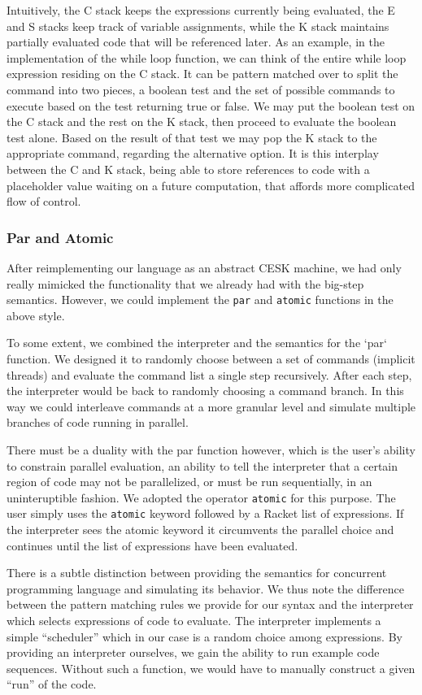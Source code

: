 Intuitively, the C stack keeps the expressions currently being evaluated, the E and S stacks keep track of variable assignments, while the K stack maintains partially evaluated code that will be referenced later.  As an example, in the implementation of the while loop function, we can think of the entire while loop expression residing on the C stack.  It can be pattern matched over to split the command into two pieces, a boolean test and the set of possible commands to execute based on the test returning true or false.  We may put the boolean test on the C stack and the rest on the K stack, then proceed to evaluate the boolean test alone.  Based on the result of that test we may pop the K stack to the appropriate command, regarding the alternative option.  It is this interplay between the C and K stack, being able to store references to code with a placeholder value waiting on a future computation, that affords more complicated flow of control.  

\subsubsection{Par and Atomic}
After reimplementing our language as an abstract CESK machine, we had only really mimicked the functionality that we already had with the big-step semantics.  However, we could implement the \texttt{par} and \texttt{atomic} functions in the above style.

To some extent, we combined the interpreter and the semantics for the `par` function.  We designed it to randomly choose between a set of commands (implicit threads) and evaluate the command list a single step recursively.  After each step, the interpreter would be back to randomly choosing a command branch.  In this way we could interleave commands at a more granular level and simulate multiple branches of code running in parallel.

There must be a duality with the par function however, which is the user's ability to constrain parallel evaluation, an ability to tell the interpreter that a certain region of code may not be parallelized, or must be run sequentially, in an uninteruptible fashion.  We adopted the operator \texttt{atomic} for this purpose.  The user simply uses the \texttt{atomic} keyword followed by a Racket list of expressions.  If the interpreter sees the atomic keyword it circumvents the parallel choice and continues until the list of expressions have been evaluated.

There is a subtle distinction between providing the semantics for concurrent programming language and simulating its behavior.  We thus note the difference between the pattern matching rules we provide for our syntax and the interpreter which selects expressions of code to evaluate.  The interpreter implements a simple ``scheduler'' which in our case is a random choice among expressions.  By providing an interpreter ourselves, we gain the ability to run example code sequences.  Without such a function, we would have to manually construct a given ``run'' of the code.

